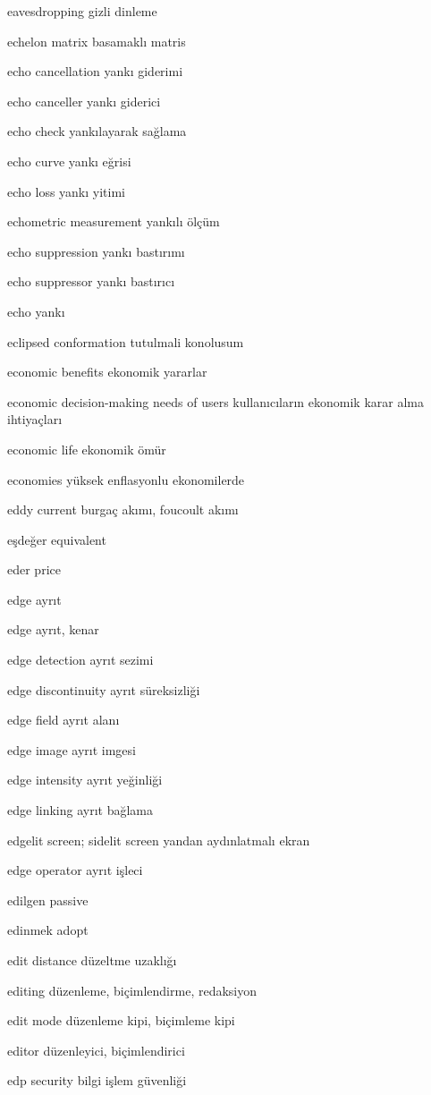 \documentclass[12pt,fleqn]{article}\usepackage{../../common}
\begin{document}
eavesdropping gizli dinleme

echelon matrix basamaklı matris

echo cancellation yankı giderimi

echo canceller yankı giderici

echo check yankılayarak sağlama

echo curve yankı eğrisi

echo loss yankı yitimi

echometric measurement yankılı ölçüm

echo suppression yankı bastırımı

echo suppressor yankı bastırıcı

echo yankı

eclipsed conformation tutulmali konolusum

economic benefits ekonomik yararlar

economic decision-making needs of users kullanıcıların ekonomik karar alma ihtiyaçları

economic life ekonomik ömür

economies yüksek enflasyonlu ekonomilerde

eddy current burgaç akımı, foucoult akımı

eşdeğer equivalent

eder price

edge ayrıt

edge ayrıt, kenar

edge detection ayrıt sezimi

edge discontinuity ayrıt süreksizliği

edge field ayrıt alanı

edge image ayrıt imgesi

edge intensity ayrıt yeğinliği

edge linking ayrıt bağlama

edgelit screen; sidelit screen yandan aydınlatmalı ekran

edge operator ayrıt işleci

edilgen passive

edinmek adopt

edit distance düzeltme uzaklığı

editing düzenleme, biçimlendirme, redaksiyon

edit mode düzenleme kipi, biçimleme kipi

editor düzenleyici, biçimlendirici

edp security bilgi işlem güvenliği
\end{document}
